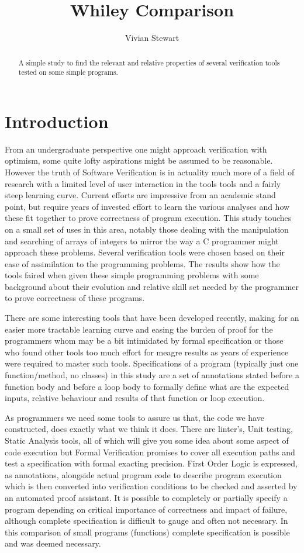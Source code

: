 \documentclass[10pt]{article} %
\title{Whiley Comparison}
\author{Vivian Stewart}
\begin{document}
\maketitle

\begin{abstract}
A simple study to find the relevant and relative properties of several verification tools tested on some simple programs.
\end{abstract}

\section{Introduction}
From an undergraduate perspective one might approach verification with optimism, some quite lofty aspirations might be assumed to be reasonable. However the truth of Software Verification is in actuality much more of a field of research with a limited level of user interaction in the tools tools and a fairly steep learning curve. Current efforts are impressive from an academic stand point, but require years of invested effort to learn the various analyses and how these fit together to prove correctness of program execution. This study touches on a small set of uses in this area, notably those dealing with the manipulation and searching of arrays of integers to mirror the way a C programmer might approach these problems. Several verification tools were chosen based on their ease of assimilation to the programming problems. The results show how the tools faired when given these simple programming problems with some background about their evolution and relative skill set needed by the programmer to prove correctness of these programs.

There are some interesting tools that have been developed recently, making for an easier more tractable learning curve and easing the burden of proof for the programmers whom may be a bit intimidated by formal specification or those who found other tools too much effort for meagre results as years of experience were required to master such tools. Specifications of a program (typically just one function/method, no classes) in this study are a set of annotations stated before a function body and before a loop body to formally define what are the expected inputs, relative behaviour and results of that function or loop execution.

As programmers we need some tools to assure us that, the code we have constructed, does exactly what we think it does. There are linter's, Unit testing, Static Analysis tools, all of which will give you some idea about some aspect of code execution but Formal Verification promises to cover all execution paths and test a specification with formal exacting precision. First Order Logic is expressed, as annotations, alongside actual program code to describe program execution which is then converted into verification conditions to be checked and asserted by an automated proof assistant. It is possible to completely or partially specify a program depending on critical importance of correctness and impact of failure, although complete specification is difficult to gauge and often not necessary. In this comparison of small programs (functions) complete specification is possible and was deemed necessary.
\end{document}
